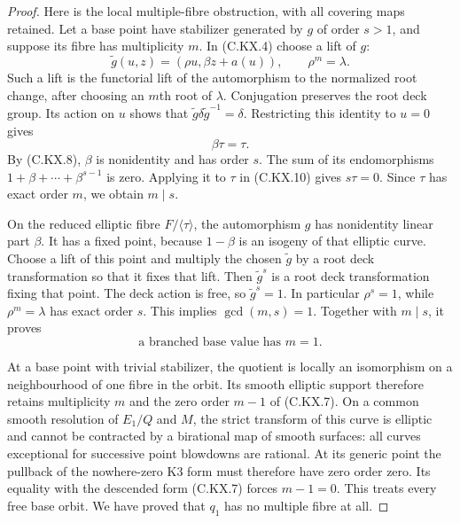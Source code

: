 \begin{proof}
Here is the local
multiple-fibre
obstruction, with
all covering maps
retained. Let a
base point have
stabilizer generated
by $g$ of order
$s>1$, and suppose
its fibre has
multiplicity $m$.
In (C.KX.4) choose
a lift of $g$:
\[
 \widetilde g(u,z)
       =(\rho u,\beta z+a(u)),\qquad
       \rho^m=\lambda .
                                                               \tag{C.KX.9}
\]
Such a lift is the
functorial lift of
the automorphism
to the normalized
root change, after
choosing an $m$th
root of $\lambda$.
Conjugation preserves
the root deck group.
Its action on $u$
shows that
$\widetilde g\delta
 \widetilde g^{-1}=\delta$.
Restricting this
identity to $u=0$
gives
\[
                         \beta\tau=\tau .
                                                               \tag{C.KX.10}
\]
By (C.KX.8), $\beta$
is nonidentity and
has order $s$.
The sum of its
endomorphisms
$1+\beta+\cdots+\beta^{s-1}$
is zero. Applying
it to $\tau$ in
(C.KX.10) gives
$s\tau=0$.
Since $\tau$ has
exact order $m$,
we obtain $m\mid s$.

On the reduced
elliptic fibre
$F/\langle\tau\rangle$,
the automorphism
$g$ has nonidentity
linear part $\beta$.
It has a fixed
point, because
$1-\beta$ is an
isogeny of that
elliptic curve.
Choose a lift of
this point and
multiply the
chosen $\widetilde g$
by a root deck
transformation so
that it fixes
that lift.
Then $\widetilde g^s$
is a root deck
transformation
fixing that point.
The deck action
is free, so
$\widetilde g^s=1$.
In particular
$\rho^s=1$, while
$\rho^m=\lambda$
has exact order
$s$. This implies
$\gcd(m,s)=1$.
Together with
$m\mid s$, it
proves
\[
          \text{a branched base value has }m=1 .
                                                               \tag{C.KX.11}
\]

At a base point
with trivial
stabilizer, the
quotient is locally
an isomorphism
on a neighbourhood
of one fibre in
the orbit. Its
smooth elliptic
support therefore
retains multiplicity
$m$ and the zero
order $m-1$ of
(C.KX.7).
On a common smooth
resolution of
$E_1/Q$ and $M$,
the strict transform
of this curve is
elliptic and cannot
be contracted by
a birational map
of smooth surfaces:
all curves
exceptional for
successive point
blowdowns are
rational.
At its generic
point the pullback
of the nowhere-zero
K3 form must
therefore have
zero order zero.
Its equality with
the descended form
(C.KX.7) forces
$m-1=0$.
This treats every
free base orbit.
We have proved
that $q_1$ has
no multiple fibre
at all.


\end{proof}
